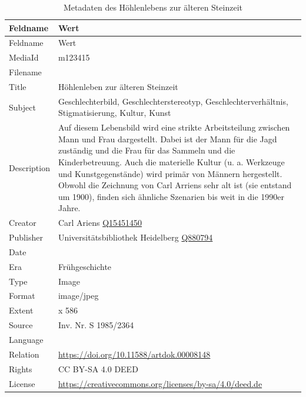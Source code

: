 \documentclass[
  letterpaper,
  DIV=11,
  numbers=noendperiod]{scrartcl}
\begin{document}
\begin{longtable}[]{@{}
  >{\raggedright\arraybackslash}p{}
  >{\raggedright\arraybackslash}p{}@{}}
\caption{Metadaten des Höhlenlebens zur älteren
Steinzeit}\label{tbl-metadaten-hoehlenleben-zur-aelteren-steinzeit}\tabularnewline
\toprule\noalign{}
\begin{minipage}[b]{\linewidth}\raggedright
Feldname
\end{minipage} & \begin{minipage}[b]{\linewidth}\raggedright
Wert
\end{minipage} \\
\midrule\noalign{}
\endfirsthead
\toprule\noalign{}
\begin{minipage}[b]{\linewidth}\raggedright
Feldname
\end{minipage} & \begin{minipage}[b]{\linewidth}\raggedright
Wert
\end{minipage} \\
\midrule\noalign{}
\endhead
\bottomrule\noalign{}
\endlastfoot
MediaId & m123415 \\
Filename & \\
Title & Höhlenleben zur älteren Steinzeit \\
Subject & Geschlechterbild, Geschlechterstereotyp,
Geschlechterverhältnis, Stigmatisierung, Kultur, Kunst \\
Description & Auf diesem Lebensbild wird eine strikte Arbeitsteilung
zwischen Mann und Frau dargestellt. Dabei ist der Mann für die Jagd
zuständig und die Frau für das Sammeln und die Kinderbetreuung. Auch die
materielle Kultur (u. a. Werkzeuge und Kunstgegenstände) wird primär von
Männern hergestellt. Obwohl die Zeichnung von Carl Arriens sehr alt ist
(sie entstand um 1900), finden sich ähnliche Szenarien bis weit in die
1990er Jahre. \\
Creator & Carl Ariens
\href{https://www.wikidata.org/wiki/Q15451450}{Q15451450} \\
Publisher & Universitätsbibliothek Heidelberg
\href{https://www.wikidata.org/wiki/Q880794}{Q880794} \\
Date & 1927 \\
Era & Frühgeschichte \\
Type & Image \\
Format & image/jpeg \\
Extent & 842 x 586 \\
Source & Inv. Nr. S 1985/2364 \\
Language & \\
Relation & \url{https://doi.org/10.11588/artdok.00008148} \\
Rights & CC BY-SA 4.0 DEED \\
License &
\url{https://creativecommons.org/licenses/by-sa/4.0/deed.de} \\
\end{longtable}
\end{document}
